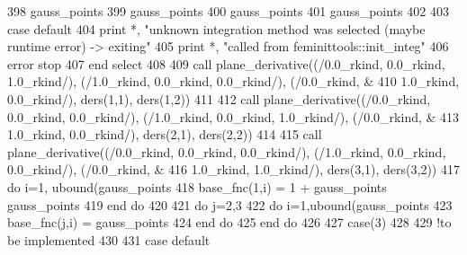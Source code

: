 \begin{DoxyCode}
{{{{{{{{{{{{{{{{{{{{{{{{{{{{{{{{{{{{{{{{{{{{{{{{{{{{{398 \textcolor{comment}{                gauss_points%
399 \textcolor{comment}{                gauss_points%
400 \textcolor{comment}{                gauss_points%
401 \textcolor{comment}{                gauss_points%
402 \textcolor{comment}{}
403 \textcolor{comment}{}\textcolor{keywordflow}{              case default}
404                 print *, \textcolor{stringliteral}{"unknown integration method was selected (maybe runtime error) -> exiting"}
405                 print *, \textcolor{stringliteral}{"called from feminittools::init\_integ"}
406                 error stop
407 \textcolor{keywordflow}{            end select}
408 
409             \textcolor{keyword}{call }plane_derivative((/0.0\_rkind, 0.0\_rkind, 1.0\_rkind/), (/1.0\_rkind\textcolor{comment}{, 0.0\_rkind, 0.0\_rkind/),
       (/0.0\_rkind, &}
410 \textcolor{comment}{                                1.0\_rkind, 0.0\_rkind/), ders(1,1), ders(1,2))}
411 \textcolor{comment}{}
412 \textcolor{comment}{            }\textcolor{keyword}{call }plane_derivative((/0.0\_rkind, 0.0\_rkind, 0.0\_rkind/), (/1.0\_rkind\textcolor{comment}{, 0.0\_rkind, 1.0\_rkind/),
       (/0.0\_rkind, &}
413 \textcolor{comment}{                                1.0\_rkind, 0.0\_rkind/), ders(2,1), ders(2,2))}
414 \textcolor{comment}{            }
415 \textcolor{comment}{            }\textcolor{keyword}{call }plane_derivative((/0.0\_rkind, 0.0\_rkind, 0.0\_rkind/), (/1.0\_rkind\textcolor{comment}{, 0.0\_rkind, 0.0\_rkind/),
       (/0.0\_rkind, &}
416 \textcolor{comment}{                                1.0\_rkind, 1.0\_rkind/), ders(3,1), ders(3,2))}
417 \textcolor{comment}{            }\textcolor{keywordflow}{do} i=1, ubound(gauss_points%
418               base_fnc(1,i) = 1 + gauss_points%
      gauss_points%
419 \textcolor{comment}{}\textcolor{keywordflow}{            end do}
420 
421             \textcolor{keywordflow}{do} j=2,3
422               \textcolor{keywordflow}{do} i=1,ubound(gauss_points%
423                 base_fnc(j,i) = gauss_points%
424 \textcolor{comment}{}\textcolor{keywordflow}{              end do}
425 \textcolor{keywordflow}{            end do}
426 
427           \textcolor{keywordflow}{case}(3)
428 
429           \textcolor{comment}{!to be implemented}
430 
431 \textcolor{keywordflow}{          case default}
}}}}}}}}}}}}}}}}}}}}}}}}}}}}}}}}}}}}}}}}}}}}}}}}}}}}}}}}}
\end{DoxyCode}
